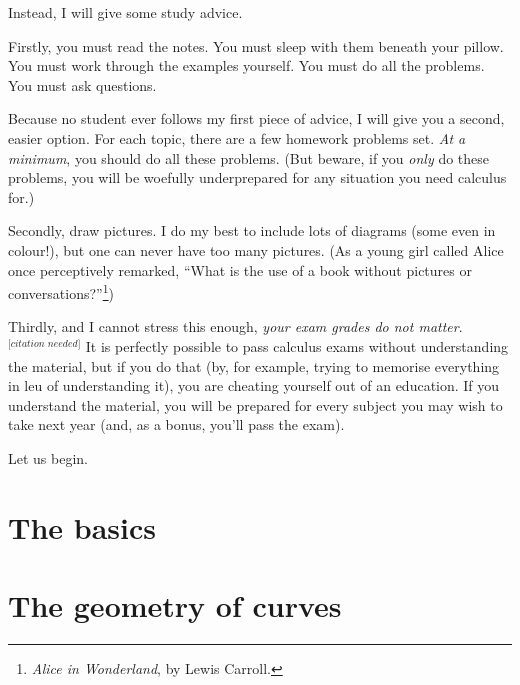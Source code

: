 \documentclass[a4paper]{memoir}
\theoremstyle{definition}
\begin{document}
Instead, I will give some study advice.

Firstly, you must read the notes. You must sleep with them beneath your pillow. You must work through the examples yourself. You must
do all the problems. You must ask questions.

Because no student ever follows my first piece of advice, I will give you a second, easier option. For each topic, there are a few
homework problems set. \emph{At a minimum}, you should do all these problems. (But beware, if you \emph{only} do these problems, you
will be woefully underprepared for any situation you need calculus for.)

Secondly, draw pictures. I do my best to include lots of diagrams (some even in colour!), but one can never have too many
pictures. (As a young girl called Alice once perceptively remarked, ``What is the use of a book without pictures or
conversations?''\footnote{\emph{Alice in Wonderland}, by Lewis Carroll.})

Thirdly, and I cannot stress this enough, \emph{your exam grades do not matter}.$^\textit{[citation needed]}$ It is perfectly possible to pass calculus exams
without understanding the material, but if you do that (by, for example, trying to memorise everything in leu of understanding it),
you are cheating yourself out of an education. If you understand the material, you will be prepared for every subject you may wish
to take next year (and, as a bonus, you'll pass the exam).

Let us begin.

\cleardoublepage
\begin{KeepFromToc}
\tableofcontents*
\end{KeepFromToc}

\mainmatter


\chapter{The basics}










\chapter{The geometry of curves}





\end{document}
